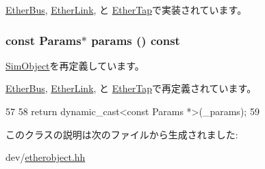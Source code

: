 \hyperlink{classEtherBus_a10260c5a583c0894dcdcd1ced50a53ae}{EtherBus}, \hyperlink{classEtherLink_a10260c5a583c0894dcdcd1ced50a53ae}{EtherLink}, と \hyperlink{classEtherTap_a10260c5a583c0894dcdcd1ced50a53ae}{EtherTap}で実装されています。\hypertarget{classEtherObject_acd3c3feb78ae7a8f88fe0f110a718dff}{
\subsubsection[{params}]{\setlength{\rightskip}{0pt plus 5cm}const {\bf Params}$\ast$ params () const}}
\label{classEtherObject_acd3c3feb78ae7a8f88fe0f110a718dff}


\hyperlink{classSimObject_acd3c3feb78ae7a8f88fe0f110a718dff}{SimObject}を再定義しています。

\hyperlink{classEtherBus_acd3c3feb78ae7a8f88fe0f110a718dff}{EtherBus}, \hyperlink{classEtherLink_acd3c3feb78ae7a8f88fe0f110a718dff}{EtherLink}, と \hyperlink{classEtherTap_acd3c3feb78ae7a8f88fe0f110a718dff}{EtherTap}で再定義されています。


\begin{DoxyCode}
57     {
58         return dynamic_cast<const Params *>(_params);
59     }
\end{DoxyCode}


このクラスの説明は次のファイルから生成されました:\begin{DoxyCompactItemize}
\item 
dev/\hyperlink{etherobject_8hh}{etherobject.hh}\end{DoxyCompactItemize}
